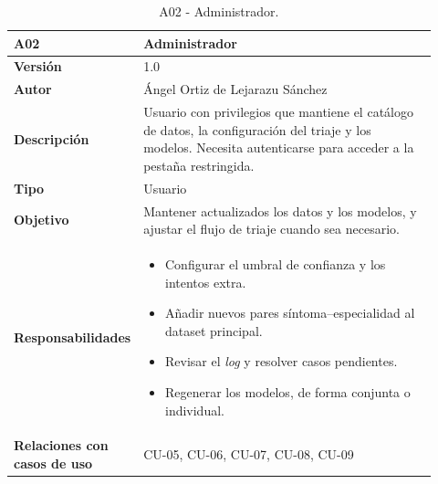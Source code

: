 \begin{table}[H]
	\centering
	\begin{tabular}{ p{0.21\linewidth} p{0.71\linewidth} }
		\toprule
		\textbf{A02}    & \textbf{Administrador}\\
		\toprule
		\textbf{Versión}         & 1.0 \\
		\textbf{Autor}           & Ángel Ortiz de Lejarazu Sánchez \\
		\textbf{Descripción}     & Usuario con privilegios que mantiene el catálogo de datos, la configuración del triaje y los modelos. Necesita autenticarse para acceder a la pestaña restringida. \\
		\textbf{Tipo}            & Usuario \\
		\textbf{Objetivo}        & Mantener actualizados los datos y los modelos, y ajustar el flujo de triaje cuando sea necesario. \\
		\textbf{Responsabilidades} &
		\begin{itemize}
			\item Configurar el umbral de confianza y los intentos extra.
			\item Añadir nuevos pares síntoma--especialidad al dataset principal.
			\item Revisar el \textit{log} y resolver casos pendientes.
			\item Regenerar los modelos, de forma conjunta o individual.
		\end{itemize} \\
		\textbf{Relaciones con casos de uso} & CU-05, CU-06, CU-07, CU-08, CU-09 \\
		\bottomrule
	\end{tabular}
	\caption{A02 - Administrador.}
\end{table}

